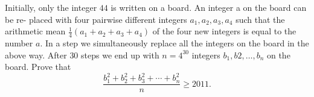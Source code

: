 Initially, only the integer $44$ is written on a board. An integer a on the board can be re- placed with four pairwise different integers $a_1, a_2, a_3, a_4$ such that the arithmetic mean $\frac 14 (a_1 + a_2 + a_3 + a_4)$ of the four new integers is equal to the number $a$. In a step we simultaneously replace all the integers on the board in the above way. After $30$ steps we end up with $n = 4^{30}$ integers $b_1, b2,\ldots, b_n$ on the board. Prove that\[\frac{b_1^2 + b_2^2+b_3^2+\cdots+b_n^2}{n}\geq 2011.\]